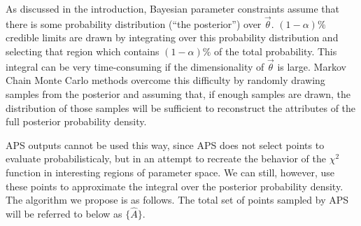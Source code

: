 \documentclass[useAMS,usenatbib]{aastex}
\begin{document}
As discussed in the introduction, Bayesian parameter constraints assume that there is some
probability distribution (``the posterior'') over $\vec{\theta}$.  
$(1-\alpha)\%$ credible limits are drawn by
integrating over this probability distribution and selecting that region which contains
$(1-\alpha)\%$ of the total probability.  This integral can be very time-consuming if the
dimensionality of $\vec{\theta}$ is large.  Markov Chain Monte Carlo methods overcome this
difficulty by randomly drawing samples from the posterior and assuming that, if enough samples
are drawn, the distribution of those samples will be sufficient to reconstruct the attributes
of the full posterior probability density.

APS outputs cannot be used this way, since APS does not select points to evaluate
probabilisticaly, but in an attempt to recreate the behavior of the $\chi^2$ function in
interesting regions of parameter space.  We can still, however, use these points to approximate
the integral over the posterior probability density.  The algorithm we propose is as follows.
The total set of points sampled by APS will be referred to below as $\{\hat{A}\}$.
\end{document}
